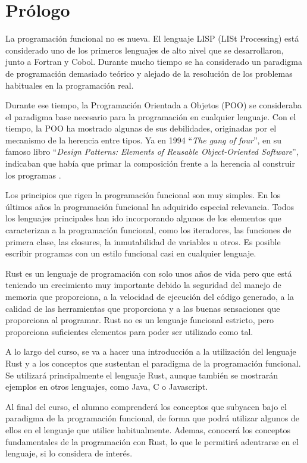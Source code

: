\chapter*{Prólogo}
\label{sec_prologo}

\noindent La programación funcional no es nueva. El lenguaje LISP (LISt Processing) está considerado uno de los primeros lenguajes de alto nivel que se desarrollaron, junto a Fortran y Cobol. Durante mucho tiempo se ha considerado un paradigma de programación demasiado teórico y alejado de la resolución de los problemas habituales en la programación real.

\smallskip

Durante ese tiempo, la Programación Orientada a Objetos (POO) se consideraba el paradigma base necesario para la programación en cualquier lenguaje. Con el tiempo, la POO ha mostrado algunas de sus debilidades, originadas por el mecanismo de la herencia entre tipos. Ya en 1994 ``\textit{The gang of four}'', en su famoso libro ``\textit{Design Patterns: Elements of Reusable Object-Oriented Software}'',  indicaban que había que primar la composición frente a la herencia al construir los programas \citep{gammaDesignPatternsElements1994}. 

\smallskip

Los principios que rigen la programación funcional son muy simples. En los últimos años la programación funcional ha adquirido especial relevancia. Todos los lenguajes principales han ido incorporando algunos de los elementos que caracterizan a la programación funcional, como los iteradores, las funciones de primera clase, las closures, la inmutabilidad de variables u otros. Es posible escribir programas con un estilo funcional casi en cualquier lenguaje.

\smallskip

Rust es un lenguaje de programación con solo unos años de vida pero que está teniendo un crecimiento muy importante debido la seguridad del manejo de memoria que proporciona, a la velocidad de ejecución del código generado, a la calidad de las herramientas que proporciona y a las buenas sensaciones que proporciona al programar. Rust no es un lenguaje funcional estricto, pero proporciona suficientes elementos para poder ser utilizado como tal. 

\smallskip

A lo largo del curso, se va a hacer una introducción a la utilización del lenguaje Rust y a los conceptos que sustentan el paradigma de la programación funcional. Se utilizará principalmente el lenguaje Rust, aunque también se mostrarán ejemplos en otros lenguajes, como Java, C o Javascript.

\smallskip

Al final del curso, el alumno comprenderá los conceptos que subyacen bajo el paradigma de la programación funcional, de forma que podrá utilizar algunos de ellos en el lenguaje que utilice habitualmente. Ademas, conocerá los conceptos fundamentales de la programación con Rust, lo que le permitirá adentrarse en el lenguaje, si lo considera de interés.

